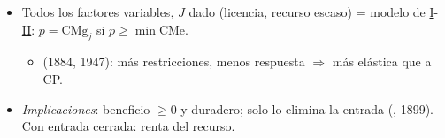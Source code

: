 \documentclass{article}
\begin{document}
\begin{columnas}
\begin{itemize}
\item Todos los factores variables, $J$ dado (licencia, recurso escaso) = modelo de \hyperref[rep:I]{I}-\hyperref[rep:II]{II}: $p=\mathrm{CMg}_j$ si $p\geq\min\mathrm{CMe}$.
  \begin{itemize}
  \item {} (1884, 1947): más restricciones, menos respuesta $\Rightarrow$ más elástica que a CP.
  \end{itemize}
\item \emph{Implicaciones}: beneficio $\geq0$ y duradero; solo lo elimina la entrada (, 1899). Con entrada cerrada: renta del recurso.
\end{itemize}


\end{columnas}
\end{document}
